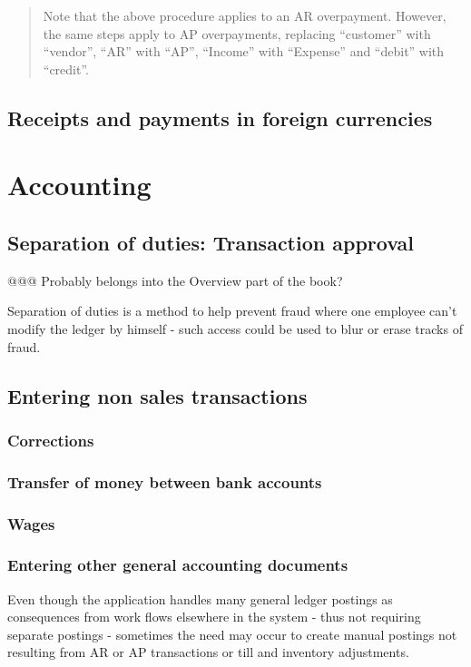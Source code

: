 \begin{quotation}
Note that the above procedure applies to an AR overpayment. However, the same steps apply to
AP overpayments, replacing ``customer'' with ``vendor'', ``AR'' with ``AP'', ``Income'' with
``Expense'' and ``debit'' with ``credit''.
\end{quotation}

\section{Receipts and payments in foreign currencies}

\chapter{Accounting}

\section{Separation of duties: Transaction approval}
\label{sec:SeparationOfDuties}
@@@ Probably belongs into the Overview part of the book?

Separation of duties is a method to help prevent fraud where one employee can't modify the
ledger by himself - such access could be used to blur or erase tracks of fraud.

\section{Entering non sales transactions}

\subsection{Corrections}
\subsection{Transfer of money between bank accounts}
\subsection{Wages}

\subsection{Entering other general accounting documents}

Even though the application handles many general ledger postings as consequences
from work flows elsewhere in the system - thus not requiring separate postings -
sometimes the need may occur to create manual postings not resulting from
AR or AP transactions or till and inventory adjustments.


